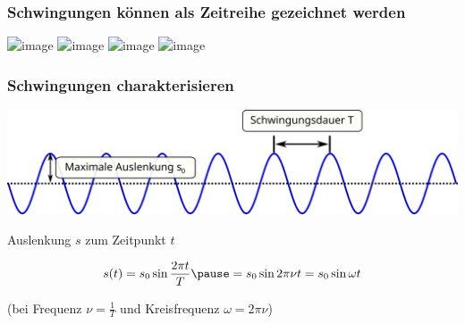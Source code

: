 \documentclass{beamer}
\begin{document}
\begin{frame}
\frametitle{Schwingungen können als Zeitreihe gezeichnet werden}

\begin{center}
\includegraphics<1>[width=0.2\textwidth]{schaukel_sinus_1.png}
\includegraphics<2>[width=0.2\textwidth]{schaukel_sinus_2.png}
\includegraphics<3>[width=0.2\textwidth]{schaukel_sinus_3.png}
\includegraphics<4>[width=0.2\textwidth]{schaukel_sinus_4.png}
\end{center}

\end{frame}


\begin{frame}
\frametitle{Schwingungen charakterisieren}


\begin{center}

\includegraphics[width=\textwidth]{schwingungen_groessen.png}
\end{center}

\pause

Auslenkung \(s\) zum Zeitpunkt \(t\)

\[
s(t) = s_0\sin\frac{2\pi t}{T} \pause =  s_0\sin 2\pi\nu t = s_0 \sin \omega t
\]

(bei Frequenz \(\nu = \frac{1}{T}\) und Kreisfrequenz \(\omega = 2\pi\nu\))

\end{frame}
\end{document}
